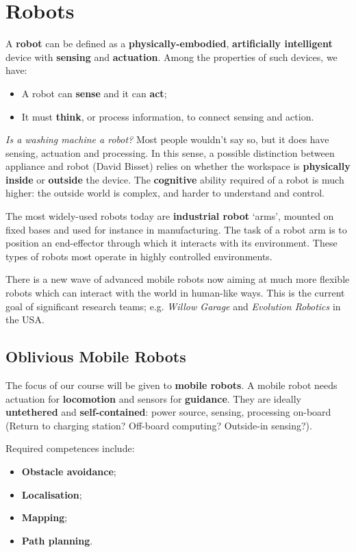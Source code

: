 \section{Robots}
A \textbf{robot} can be defined as a \textbf{physically-embodied}, \textbf{artificially intelligent} device with \textbf{sensing} and \textbf{actuation}. Among the properties of such devices, we have:
\begin{itemize}
    \item A robot can \textbf{sense} and it can \textbf{act};
    \item It must \textbf{think}, or process information, to connect sensing and action.
\end{itemize}

\textit{Is a washing machine a robot?} Most people wouldn’t say so, but it does have sensing, actuation and processing. In this sense, a possible distinction between appliance and robot (David Bisset) relies on whether the workspace is \textbf{physically inside} or \textbf{outside} the device. The \textbf{cognitive} ability required of a robot is much higher: the outside world is complex, and harder to understand and control.

The most widely-used robots today are \textbf{industrial robot} ‘arms’, mounted on fixed bases and used for instance in manufacturing. The task of a robot arm is to position an end-effector through which it interacts with its environment. These types of robots most operate in highly controlled environments.

There is a new wave of advanced mobile robots now aiming at much more flexible robots which can interact with the world in human-like ways. This is the current goal of significant research teams; e.g. \textit{Willow Garage} and \textit{Evolution Robotics} in the USA.

\subsection{Oblivious Mobile Robots}
The focus of our course will be given to \textbf{mobile robots}. A mobile robot needs actuation for \textbf{locomotion} and sensors for \textbf{guidance}. They are ideally \textbf{untethered} and \textbf{self-contained}: power source, sensing, processing on-board (Return to charging station? Off-board computing? Outside-in sensing?).

Required competences include:
\begin{itemize}
    \item \textbf{Obstacle avoidance};
    \item \textbf{Localisation};
    \item \textbf{Mapping};
    \item \textbf{Path planning}.
\end{itemize}

